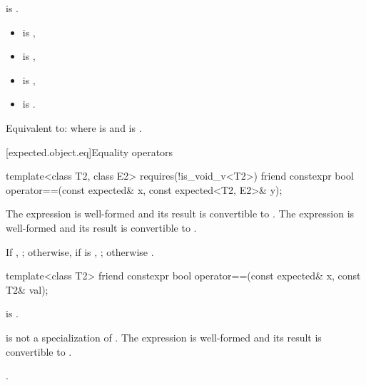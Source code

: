 \begin{itemdescr}
\pnum
\constraints
{} is .

\pnum
\mandates
\begin{itemize}
\item {} is ,
\item {} is ,
\item {} is ,
\item {} is .
\end{itemize}

\pnum
\effects
Equivalent to:  where  is  and  is .
\end{itemdescr}

[expected.object.eq]{Equality operators}

%
\begin{itemdecl}
template<class T2, class E2>
  requires(!is_void_v<T2>)
  friend constexpr bool operator==(const expected& x, const expected<T2, E2>& y);
\end{itemdecl}

\begin{itemdescr}
\pnum
\mandates
The expression  is well-formed and its result is convertible to . The expression  is well-formed and its result is convertible to .

\pnum
\returns
If , ; otherwise, if  is , ; otherwise .
\end{itemdescr}

%
\begin{itemdecl}
template<class T2>
  friend constexpr bool operator==(const expected& x, const T2& val);
\end{itemdecl}

\begin{itemdescr}
\pnum
\constraints
{} is .

\pnum
\mandates
{} is not a specialization of . The expression  is well-formed and its result is convertible to .

\pnum
\returns
{}.
\end{itemdescr}

